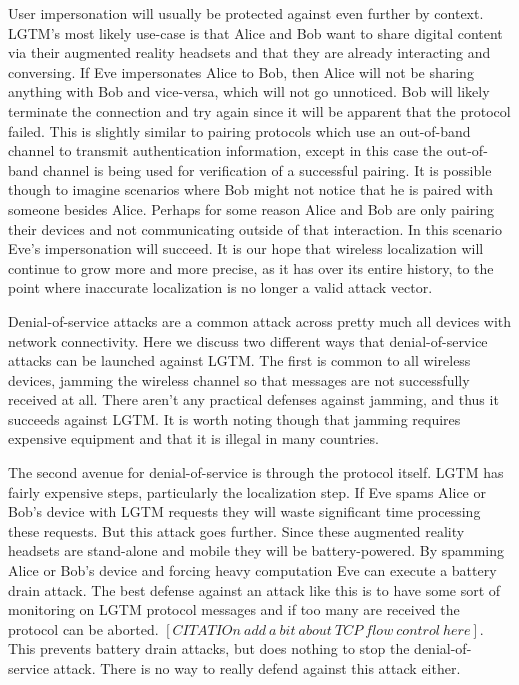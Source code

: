 \documentclass[12pt]{report}
\begin{document}
User impersonation will usually be protected against even further by context. LGTM's most likely use-case is that Alice and Bob want to share digital content via their augmented reality headsets and that they are already interacting and conversing. If Eve impersonates Alice to Bob, then Alice will not be sharing anything with Bob and vice-versa, which will not go unnoticed. Bob will likely terminate the connection and try again since it will be apparent that the protocol failed. This is slightly similar to pairing protocols which use an out-of-band channel to transmit authentication information, except in this case the out-of-band channel is being used for verification of a successful pairing. It is possible though to imagine scenarios where Bob might not notice that he is paired with someone besides Alice. Perhaps for some reason Alice and Bob are only pairing their devices and not communicating outside of that interaction. In this scenario Eve's impersonation will succeed. It is our hope that wireless localization will continue to grow more and more precise, as it has over its entire history, to the point where inaccurate localization is no longer a valid attack vector. \par

Denial-of-service attacks are a common attack across pretty much all devices with network connectivity. Here we discuss two different ways that denial-of-service attacks can be launched against LGTM. The first is common to all wireless devices, jamming the wireless channel so that messages are not successfully received at all. There aren't any practical defenses against jamming, and thus it succeeds against LGTM. It is worth noting though that jamming requires expensive equipment and that it is illegal in many countries. \par

The second avenue for denial-of-service is through the protocol itself. LGTM has fairly expensive steps, particularly the localization step. If Eve spams Alice or Bob's device with LGTM requests they will waste significant time processing these requests. But this attack goes further. Since these augmented reality headsets are stand-alone and mobile they will be battery-powered. By spamming Alice or Bob's device and forcing heavy computation Eve can execute a battery drain attack. The best defense against an attack like this is to have some sort of monitoring on LGTM protocol messages and if too many are received the protocol can be aborted. $[CITATIOn \: add \: a \: bit \: about \: TCP \: flow \: control \: here]$. This prevents battery drain attacks, but does nothing to stop the denial-of-service attack. There is no way to really defend against this attack either. \par
\end{document}
